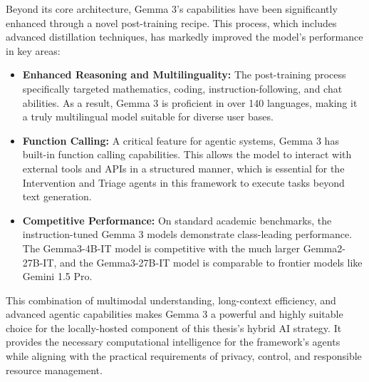 
Beyond its core architecture, Gemma 3's capabilities have been significantly enhanced through a novel post-training recipe. This process, which includes advanced distillation techniques, has markedly improved the model's performance in key areas:

\begin{itemize}
    \item \textbf{Enhanced Reasoning and Multilinguality:} The post-training process specifically targeted mathematics, coding, instruction-following, and chat abilities. As a result, Gemma 3 is proficient in over 140 languages, making it a truly multilingual model suitable for diverse user bases.
    \item \textbf{Function Calling:} A critical feature for agentic systems, Gemma 3 has built-in function calling capabilities. This allows the model to interact with external tools and APIs in a structured manner, which is essential for the Intervention and Triage agents in this framework to execute tasks beyond text generation.
    \item \textbf{Competitive Performance:} On standard academic benchmarks, the instruction-tuned Gemma 3 models demonstrate class-leading performance. The Gemma3-4B-IT model is competitive with the much larger Gemma2-27B-IT, and the Gemma3-27B-IT model is comparable to frontier models like Gemini 1.5 Pro.
\end{itemize}

This combination of multimodal understanding, long-context efficiency, and advanced agentic capabilities makes Gemma 3 a powerful and highly suitable choice for the locally-hosted component of this thesis's hybrid AI strategy. It provides the necessary computational intelligence for the framework's agents while aligning with the practical requirements of privacy, control, and responsible resource management.

